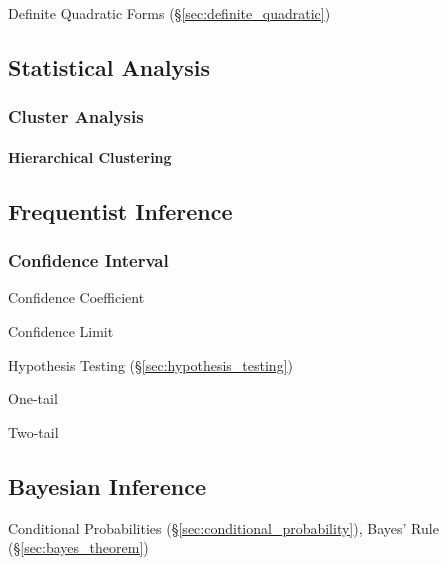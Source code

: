 Definite Quadratic Forms (\S\ref{sec:definite_quadratic})



\subsection{Statistical Analysis}\label{sec:statistical_analysis}

\subsubsection{Cluster Analysis}\label{sec:cluster_analysis}

\paragraph{Hierarchical Clustering}\label{sec:hierarchical_clustering}\hfill



\subsection{Frequentist Inference}\label{sec:frequentist_inference}

\subsubsection{Confidence Interval}\label{sec:confidence_interval}

Confidence Coefficient

Confidence Limit

Hypothesis Testing (\S\ref{sec:hypothesis_testing})

One-tail

Two-tail



\subsection{Bayesian Inference}\label{sec:bayesian_inference}

Conditional Probabilities (\S\ref{sec:conditional_probability}), Bayes' Rule
(\S\ref{sec:bayes_theorem})

